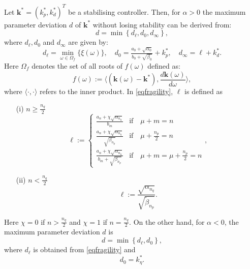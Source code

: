\documentclass[twoside,reqno,11pt]{fcaa-var} %
\begin{document}
\begin{proposition}\label{prop:fragility}
	Let $\bm{k}^*=(k_p^*,k_d^*)^T$ be a stabilising controller. Then, for $\alpha>0$ the maximum parameter deviation $d$ of $\bm{k}^*$ without losing stability can be derived from:
	\begin{equation}
	d=\min\left\{d_\ell,d_0,d_\infty\right\}, \label{eqdistance}
	\end{equation}
	where $d_\ell, d_0$ and $d_\infty$ are given by:
	\begin{equation}
	d_\ell=\min\limits_{\omega\in\Omega_f}\{\xi(\omega)\}, \quad d_0=\tfrac{a_0+\sqrt{\alpha_0}}{b_0+\sqrt{\beta_0}}+k_p^*,\quad d_\infty=\ell+k_d^*. \label{eqfragility}
	\end{equation}
	Here $\Omega_f$ denotes the set of all roots of $f(\omega)$ defined as:
	\begin{equation}
	f(\omega):=\langle (\bm{k}(\omega)-\bm{k}^*),\frac{d\bm{k}(\omega)}{d\omega}\rangle, \label{eqfCRB}
	\end{equation}
	where $\langle\cdot,\cdot\rangle$ refers to the inner product. In \eqref{eqfragility}, $\ell$ is defined as
	\begin{itemize}
		\item [(i)] $n\geq\frac{n_q}{2}$
		\begin{equation}
		\ell:=\begin{cases} \frac{a_n+\chi\sqrt{\alpha_{n_q}}}{b_m} & \text{if}\quad \mu+m=n \\
		\frac{a_n+\chi\sqrt{\alpha_{n_q}}}{\sqrt{\beta_{n_p}}} & \text{if}\quad \mu+\tfrac{n_p}{2}=n \\
		\frac{a_n+\chi\sqrt{\alpha_{n_q}}}{b_m+\sqrt{\beta_{n_p}}} & \text{if}\quad \mu+m=\mu+\tfrac{n_p}{2}=n
		\end{cases}, \label{eqFa}
		\end{equation}
		\item [(ii)] $n<\frac{n_q}{2}$
		\begin{equation}
		\ell:=\frac{\sqrt{\alpha_{n_q}}}{\sqrt{\tilde{\beta}_{n_p}}}. \label{eqFb}
		\end{equation}
	\end{itemize}
	Here $\chi=0$ if $n>\frac{n_q}{2}$ and $\chi=1$ if $n=\frac{n_q}{2}$. On the other hand, for $\alpha<0$, the maximum parameter deviation $d$ is
	\begin{equation}
	d=\min\left\{d_\ell,d_0\right\}, \label{eqdistance2}
	\end{equation}
	where $d_\ell$ is obtained from \eqref{eqfragility}  and
	\begin{equation}
	d_0=k_\eta^*. \label{eqfragility2}
	\end{equation}
\end{proposition}
\end{document}
